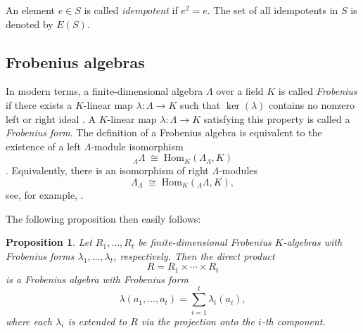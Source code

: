 \documentclass[11pt,reqno]{amsart}
\theoremstyle{plain}
\newtheorem{prop}[thm]{Proposition}
\theoremstyle{remark}
\theoremstyle{definition}
\newcommand{\bb}[1]{\textcolor{blue}{{#1}}}
\begin{document}
An element \( e \in S \) is called \emph{idempotent} if \( e^2 = e \). The set of all idempotents in \( S \) is denoted by \( E(S) \). 



\subsection{Frobenius algebras}
In modern terms, a finite-dimensional algebra $\Lambda$ over a field $K$ is called \emph{Frobenius} if there exists
a $K$-linear map $\lambda : \Lambda \to K$ such that $\ker(\lambda)$ contains no nonzero left or right ideal
\cite[Definition 1.6]{Benson-Rep-coh}.
A $K$-linear map $\lambda : \Lambda \to K$ satisfying this property is called a \emph{Frobenius form}.
The definition of a Frobenius algebra is equivalent to the existence of a left $\Lambda$-module
isomorphism
\[
{}_{\Lambda}\Lambda \;\cong\; \mathrm{Hom}_K(\Lambda_{\Lambda},K)
\]
\cite[Theorem~3.15]{LamTY}.
Equivalently, there is an isomorphism of right $\Lambda$-modules
\[
\Lambda_{\Lambda} \;\cong\; \mathrm{Hom}_K({}_{\Lambda}\Lambda,K),
\]
see, for example, \cite[Exercise~31.(5.3)]{MR1245487}.

The following proposition then easily follows:
\begin{prop}\label{DirectProLambda}%
Let $R_1, \dots, R_t$ be finite-dimensional Frobenius $K$-algebras
with Frobenius forms $\lambda_1, \dots, \lambda_t$, respectively.
Then the direct product
\[
R = R_1 \times \cdots \times R_t
\]
is a Frobenius algebra with Frobenius form
\[
\lambda(a_1,\dots,a_t) = \sum_{i=1}^t \lambda_i(a_i),
\]
where each $\lambda_i$ is extended to $R$ via the projection onto the $i$-th component.
\end{prop}
\end{document}
